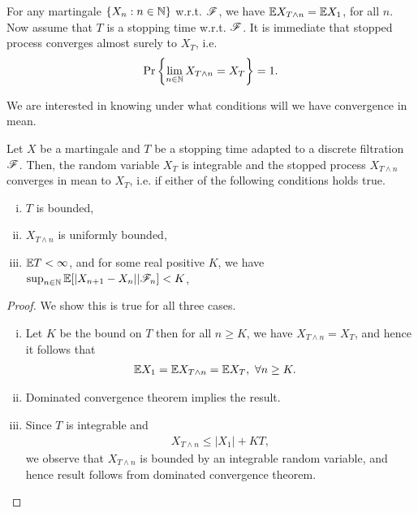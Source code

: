 \documentclass[a4paper,10pt,english]{article}
\begin{document}
\begin{rem}
For any martingale $\{X_n: n \in \mathbb{N}\}$ w.r.t. $\mathscr{F}$, we have $\mathbb{E} X_{T\wedge n} =\mathbb{E} X_1$, for all $n$.  
Now assume that $T$ is a stopping time w.r.t. $\mathscr{F}$. 
It is immediate that stopped process converges almost surely to $X_T$, i.e. 
\begin{align*}
\Pr\left\{\lim_{n\in \mathbb{N}}{X}_{T\wedge n} = X_T\right\} = 1.
\end{align*}
\end{rem}
We are interested in knowing under what conditions will we have convergence in mean. %
\begin{thm}
\label{MartStopThm}
Let $X$ be a martingale and $T$ be a stopping time adapted to a discrete filtration $\mathscr{F}$. 
Then, the random variable $X_T$ is integrable and the stopped process $X_{T \wedge n}$ converges in mean to $X_T$, i.e.
if 
either of the following conditions holds true. 
\begin{enumerate}[(i)]
\item $T$ is bounded, 
\item $X_{T\wedge n}$ is uniformly bounded,
\item $\mathbb{E} T < \infty$, and for some real positive $K$, we have $\sup_{n \in \mathbb{N}}\mathbb{E}[|X_{n+1}-X_n||\mathscr{F}_n] < K$,
\end{enumerate}
\end{thm}
\begin{proof} We show this is true for all three cases.
\begin{enumerate}[(i)] 
\item Let $K$ be the bound on $T$ then for all $n \geq K$, we have $X_{T\wedge n} = X_T$, and hence it follows that
\begin{align*}
\mathbb{E} X_1 = \mathbb{E} X_{T\wedge n} &= \mathbb{E} X_T, ~\forall n \geq K.
\end{align*}
\item Dominated convergence theorem implies the result. 
\item Since $T$ is integrable and  
\begin{align*} 
X_{T\wedge n} \leq |X_1| + K T,
\end{align*}
we observe that $X_{T\wedge n}$ is bounded by an integrable random variable, and hence result follows from dominated convergence theorem.
\end{enumerate}
\end{proof}
\end{document}
